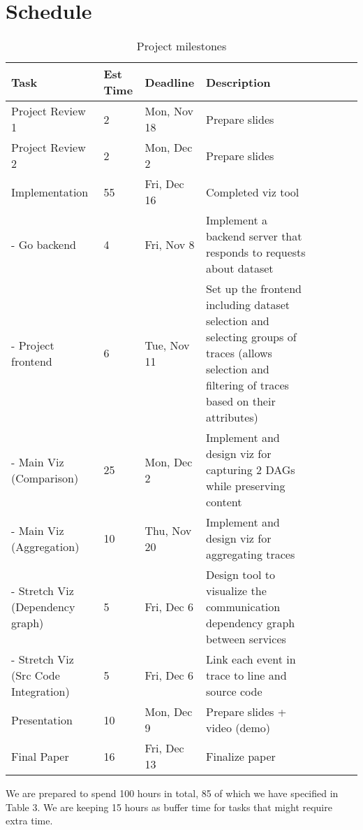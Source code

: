 \section{Schedule}

\begin{table*}[t]
    \centering
\begin{adjustbox}{width=1\textwidth}
    \begin{tabular}{l*{6}{l}r}
        \textbf{Task}              & \textbf{Est Time} & \textbf{Deadline} & \textbf{Description} \\
        \hline
        Project Review 1 & 2 & Mon, Nov 18 & Prepare slides\\
        Project Review 2 & 2 & Mon, Dec 2 & Prepare slides\\
        Implementation & 55 & Fri, Dec 16 & Completed viz tool\\
        - Go backend & 4 & Fri, Nov 8 & Implement a backend server that responds to requests about dataset\\
        - Project frontend & 6 & Tue, Nov 11 & Set up the frontend including dataset selection and selecting groups of traces (allows selection and filtering of traces based on their attributes)\\
        - Main Viz (Comparison) & 25 & Mon, Dec 2 & Implement and design viz for capturing 2 DAGs while preserving content\\
        - Main Viz (Aggregation) & 10 & Thu, Nov 20 & Implement and design viz for aggregating traces\\ 
        - Stretch Viz (Dependency graph) & 5 & Fri, Dec 6 & Design tool to visualize the communication dependency graph between services\\
        - Stretch Viz (Src Code Integration) & 5 & Fri, Dec 6 & Link each event in trace to line and source code\\
        Presentation & 10 & Mon, Dec 9 & Prepare slides + video (demo)\\
        Final Paper & 16 & Fri, Dec 13 & Finalize paper\\
        \end{tabular}
\end{adjustbox}
\label{tab:milestones}
\caption{Project milestones}
\end{table*}

We are prepared to spend 100 hours in total, 85 of which we have specified in Table 3.
We are keeping 15 hours as buffer time for tasks that might require extra time.